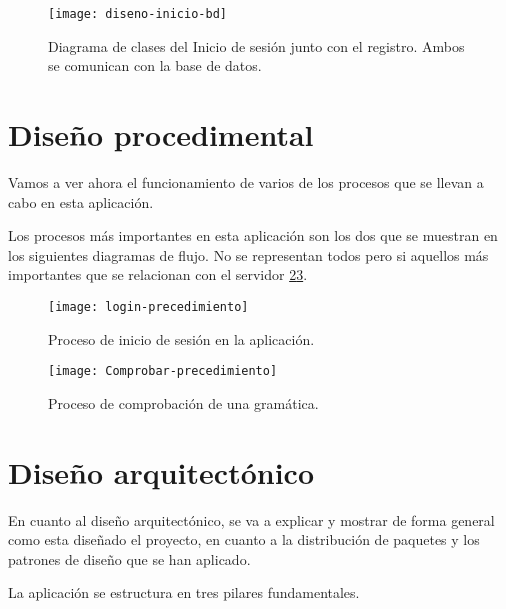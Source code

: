 \begin{figure}[h]
\centering
\texttt{[image: diseno-inicio-bd]}
\caption{Diagrama de clases del Inicio de sesión junto con el registro. Ambos se comunican con la base de datos.}
\label{fig:4.5}
\end{figure}


\section{Diseño procedimental}

Vamos a ver ahora el funcionamiento de varios de los procesos que se llevan a cabo en esta aplicación.
 
Los procesos más importantes en esta aplicación son los dos que se muestran en los siguientes diagramas de flujo. No se representan todos pero si aquellos más importantes que se relacionan con el servidor \ref{fig:4.6}\ref{fig:4.7}.
 \begin{figure}[h]
\centering
\texttt{[image: login-precedimiento]}
\caption{Proceso de inicio de sesión en la aplicación.}
\label{fig:4.6}
\end{figure}

\begin{figure}[h]
\centering
\texttt{[image: Comprobar-precedimiento]}
\caption{Proceso de comprobación de una gramática.}
\label{fig:4.7}
\end{figure}


\section{Diseño arquitectónico}

En cuanto al diseño arquitectónico, se va a explicar y mostrar de forma general como esta diseñado el proyecto, en cuanto a la distribución de paquetes y los patrones de diseño que se han aplicado.

La aplicación se estructura en tres pilares fundamentales.


